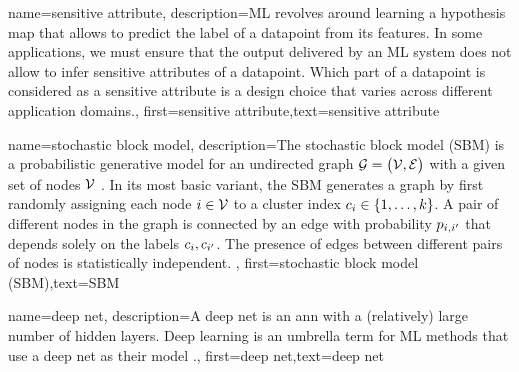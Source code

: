 {name={sensitive attribute},
	description={ML revolves around learning a \gls{hypothesis} map that allows 
		to predict the \gls{label} of a \gls{datapoint} from its \gls{feature}s. In some 
		applications, we must ensure that the output delivered by an ML system does 
		not allow to infer sensitive attributes of a \gls{datapoint}. Which part 
		of a \gls{datapoint} is considered as a sensitive attribute is a design 
		choice that varies across different application domains.},
	first={sensitive attribute},text={sensitive attribute} 
}


{name={stochastic block model},
	description={The stochastic block model (SBM) is a 
		probabilistic generative model for an undirected graph $\mathcal{G} = \big( \mathcal{V}, \mathcal{E} \big)$ 
		with a given set of nodes $\mathcal{V}$ \cite{AbbeSBM2018}. In its most basic variant, 
		the SBM generates a graph by first randomly assigning each node $i \in \mathcal{V}$ to 
		a cluster index $c_{i} \in \{1,\ldots,k\}$. A pair of different nodes in the 
		graph is connected by an edge with probability $p_{i,i'}$ that depends 
		solely on the labels $c_{i}, c_{i'}$. 
		The presence of edges between different pairs of 
		nodes is statistically independent. },
	first={stochastic block model (SBM)},text={SBM} 
}

{name={deep net},
	description={A deep net is an \gls{ann} with a (relatively) large number of 
	hidden layers. Deep learning is an umbrella term for ML methods that use a deep net as 
	their model \cite{Goodfellow-et-al-2016}.},
	first={deep net},text={deep net} 
}

\newcommand{\gaussiancenter}{3}

